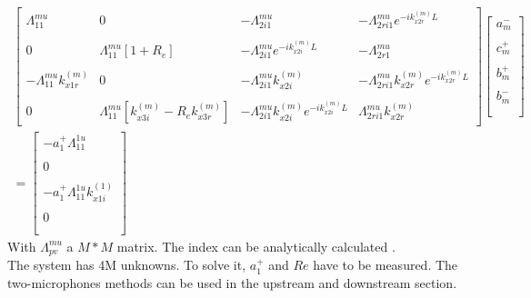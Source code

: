 \begin{gather} 
    \begin{bmatrix}
       \Lambda_{11}^{mu} & 0 & -\Lambda_{2i1}^{mu} & -\Lambda_{2ri1}^{mu}e^{-ik_{x2r}^{(m)}L} \\
       \\
      0 & \Lambda_{11}^{mu}[1+R_e] & -\Lambda_{2i1}^{mu}e^{-ik_{x2i}^{(m)}L} & -\Lambda_{2r1}^{mu}\\
      \\
      -\Lambda_{11}^{mu}k_{x1r}^{(m)} & 0 & -\Lambda_{2i1}^{mu}k_{x2i}^{(m)} & -\Lambda_{2ri1}^{mu} k_{x2r}^{(m)} e^{-ik_{x2r}^{(m)}L}\\
      \\
      0 & \Lambda_{11}^{mu}[k_{x3i}^{(m)}-R_ek_{x3r}^{(m)}]  & -\Lambda_{2i1}^{mu}k_{x2i}^{(m)}e^{-ik_{x2i}^{(m)}L} & \Lambda_{2ri1}^{mu} k_{x2r}^{(m)}
    \end{bmatrix}
    \begin{bmatrix}
       a_m^-\\
       \\
       c_m^+\\
       \\
       b_m^+\\
       \\
       b_m^-\\
       \\
    \end{bmatrix}
    \\
    =
    \begin{bmatrix}
        -a_1^+\Lambda_{11}^{1u}\\
       \\
       0\\
       \\
       -a_1^+\Lambda_{11}^{1u}k_{x1i}^{(1)}\\
       \\
       0\\
       \\
    \end{bmatrix}
\end{gather}
With $\Lambda_{pv}^{mu}$ a $M*M$ matrix. The index can be analytically calculated \cite{ModematchM}.\\
The system has 4M unknowns. To solve it, $a_1^+$ and $Re$ have to be measured. The two-microphones methods can be used in the upstream and downstream section.
